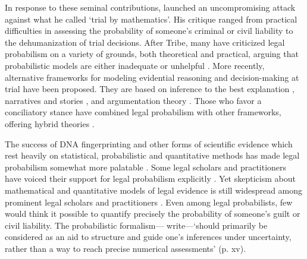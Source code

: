 \documentclass{article}
\begin{document}
In response to these seminal contributions, %
\cite{tribe71} launched an uncompromising attack against what he called `trial by mathematics'.  His critique ranged from practical difficulties in assessing the probability of someone's criminal or civil liability to the dehumanization of trial decisions. 
After Tribe, many have criticized legal probabilism on a variety of grounds, both theoretical and practical, arguing 
that probabilistic  models are either inadequate or unhelpful \citep[see, for instance,][]{Underwood1977The-thumb-on-th,cohen86, brilmayer1986,  dant1988gambling, Allen1986A-Reconceptuali}. More recently, alternative frameworks for modeling evidential reasoning and decision-making at trial have been proposed. They are based on inference 
to the best explanation \citep{Pardo2008Judicial-Proof-, Allen2010No-Plausible-Al}, narratives and stories \citep{Pennington1991},
and argumentation theory \citep{gordon2007, Walton2002, bex2011ArgumentsStoriesCriminal}.  Those who favor a conciliatory stance have combined 
legal probabilism with  other frameworks, 
offering hybrid theories \citep{verheij2014catch, Urbaniak2017Narration-in-ju}. %

The success of DNA fingerprinting and other forms of scientific evidence which rest heavily on statistical, probabilistic and quantitative  methods has made legal probabilism somewhat more palatable \citep[for a history of DNA evidence and the legal battles about its use at trial, see][]{Kaye2010The-Double-Heli}. 
Some legal scholars and practitioners have voiced their support for legal probabilism explicitly \citep{Tillers2007}.
Yet skepticism about mathematical and quantitative models of legal evidence is still widespread among prominent legal scholars and practitioners \cite[see, for example,][]{allen2007problematic}.
Even among legal probabilists, 
few would think it possible to quantify precisely the probability of someone's guilt or civil liability. The probabilistic formalism---\cite{taroni2006bayesian} write---`should primarily be considered as an aid to structure and guide one's inferences under uncertainty, rather than a way to reach precise numerical assessments' (p. xv). 
\end{document}
